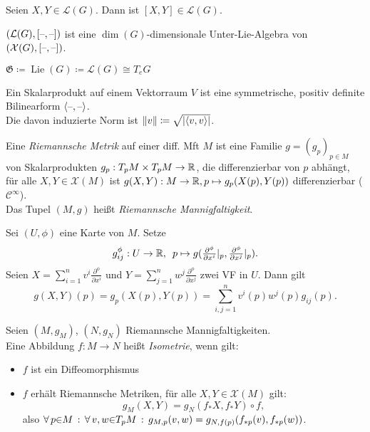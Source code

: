 \documentclass{cheat-sheet}
\newcommand{\coord}[1]{\tfrac{\partial^\phi}{\partial x^{#1}}} %
\newcommand{\Gie}{\mathfrak{G}} %
\DeclareMathOperator{\Lie}{Lie} %
\newcommand{\Cont}{\mathcal{C}} %
\newcommand{\VF}{\mathcal{X}} %
\begin{document}
\begin{lem}
  Seien $X, Y \in \mathcal{L}(G)$. Dann ist $[X, Y] \in \mathcal{L}(G)$.
\end{lem}

\begin{kor}
  $(\mathcal{L}(G), [\text{--},\text{--}])$ ist eine $\dim(G)$-dimensionale Unter-Lie-Algebra von $(\VF(G), [\blank,\blank])$.
\end{kor}

\begin{nota}
  $\Gie \coloneqq \Lie(G) \coloneqq \mathcal{L}(G) \cong T_e G$
\end{nota}


\begin{defn}
  Ein Skalarprodukt auf einem Vektorraum $V$ ist eine symmetrische, positiv definite Bilinearform $\langle \text{--}, \text{--} \rangle$. \\
  Die davon induzierte Norm ist $\lVert v\rVert \coloneqq \sqrt{\lvert\langle v, v \rangle\rvert}$.
\end{defn}

\begin{defn}
  Eine \emph{Riemannsche Metrik} auf einer diff. Mft $M$ ist eine Familie $g = (g_p)_{p \in M}$ von Skalarprodukten $g_p : T_p M \times T_p M \to \mathbb{R}$, die differenzierbar von $p$ abhängt, \dh{} für alle $X, Y \in \VF(M)$ ist $g(X, Y) : M \to \mathbb{R}, p \mapsto g_p(X(p), Y(p))$ differenzierbar ($\Cont^\infty$).\\
  Das Tupel $(M, g)$ heißt \emph{Riemannsche Mannigfaltigkeit}.
\end{defn}

\begin{bem}
  Sei $(U, \phi)$ eine Karte von $M$. Setze
  \[
    g_{ij}^{\phi} : U \to \R, \enspace
    p \mapsto g(\coord{i}|_p, \coord{j}|_p).
  \]
  Seien $X = \sum_{i=1}^n v^i \coord{i}$ und $Y = \sum_{j=1}^n w^j \coord{j}$ zwei VF in $U$. Dann gilt
  \[
    g(X, Y)(p) = g_p(X(p), Y(p)) = \sum_{i,j=1}^n v^i(p) w^j(p) g_{ij}(p).
  \]
\end{bem}

\begin{defn}
  Seien $(M, g_M)$, $(N, g_N)$ Riemannsche Mannigfaltigkeiten. \\
  Eine Abbildung $f : M \to N$ heißt \emph{Isometrie}, wenn gilt:
  \begin{itemize}
    \item $f$ ist ein Diffeomorphismus
    \item $f$ erhält Riemannsche Metriken, \dh{} für alle $X, Y \in \VF(M)$ gilt:
    \[ g_M(X, Y) = g_N(f_* X, f_* Y) \circ f, \]
    also $\forall \, {p {\in} M} \,:\, \forall \, {v, w {\in} T_p M} \,:\, g_{M,p} (v, w) = g_{N,f(p)}(f_{*p}(v), f_{*p}(w))$.
  \end{itemize}
\end{defn}
\end{document}
